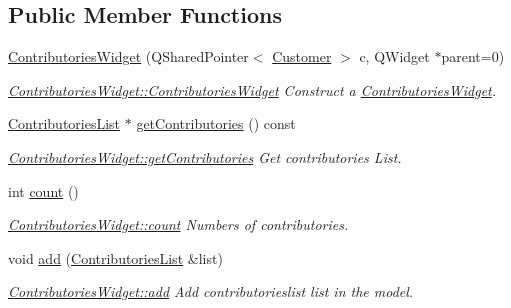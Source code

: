 \subsection*{Public Member Functions}
\begin{DoxyCompactItemize}
\item 
\hyperlink{classGui_1_1Widgets_1_1ContributoriesWidget_a5517afc134491eb118b9d183e94476bc}{Contributories\+Widget} (Q\+Shared\+Pointer$<$ \hyperlink{classModels_1_1Customer}{Customer} $>$ c, Q\+Widget $\ast$parent=0)
\begin{DoxyCompactList}\small\item\em \hyperlink{classGui_1_1Widgets_1_1ContributoriesWidget_a5517afc134491eb118b9d183e94476bc}{Contributories\+Widget\+::\+Contributories\+Widget} Construct a \hyperlink{classGui_1_1Widgets_1_1ContributoriesWidget}{Contributories\+Widget}. \end{DoxyCompactList}\item 
\hyperlink{classModels_1_1ContributoriesList}{Contributories\+List} $\ast$ \hyperlink{classGui_1_1Widgets_1_1ContributoriesWidget_a72c0f4a49aaafdf045154bafb1e76049}{get\+Contributories} () const 
\begin{DoxyCompactList}\small\item\em \hyperlink{classGui_1_1Widgets_1_1ContributoriesWidget_a72c0f4a49aaafdf045154bafb1e76049}{Contributories\+Widget\+::get\+Contributories} Get contributories List. \end{DoxyCompactList}\item 
int \hyperlink{classGui_1_1Widgets_1_1ContributoriesWidget_a7c9f1bfcac92d4813f1d43b46319042b}{count} ()
\begin{DoxyCompactList}\small\item\em \hyperlink{classGui_1_1Widgets_1_1ContributoriesWidget_a7c9f1bfcac92d4813f1d43b46319042b}{Contributories\+Widget\+::count} Numbers of contributories. \end{DoxyCompactList}\item 
void \hyperlink{classGui_1_1Widgets_1_1ContributoriesWidget_ae61498391d4aaf199bed8183961d515c}{add} (\hyperlink{classModels_1_1ContributoriesList}{Contributories\+List} \&list)
\begin{DoxyCompactList}\small\item\em \hyperlink{classGui_1_1Widgets_1_1ContributoriesWidget_ae61498391d4aaf199bed8183961d515c}{Contributories\+Widget\+::add} Add contributorieslist {\itshape list} in the model. \end{DoxyCompactList}\end{DoxyCompactItemize}


